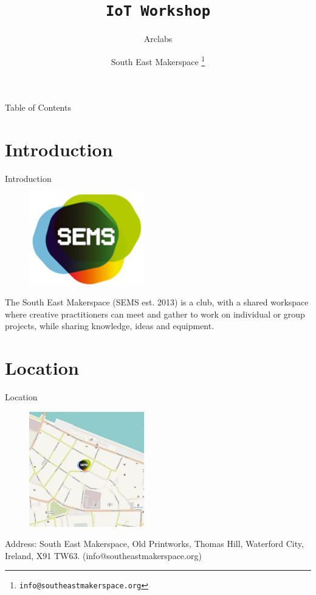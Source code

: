 \documentclass{beamer}
\title{\texttt{IoT Workshop}}
\subtitle{Arclabs}
\author{South East Makerspace \footnote{\texttt{info@southeastmakerspace.org}}}
\begin{document}
\begin{frame}
  \maketitle
\end{frame}


\begin{frame}{Table of Contents}
  \tableofcontents
\end{frame}

\section{Introduction}
\begin{frame}{Introduction}
%
\begin{figure}
	\centering
	\includegraphics[width=5cm]{images/test}
	\label{fig:logo}
\end{figure}
%

The South East Makerspace (SEMS est. 2013) is a club, with a shared workspace where creative practitioners can meet and gather to work on individual or group projects, while sharing knowledge, ideas and equipment.
\end{frame}


\section{Location}
\begin{frame}{Location}
	\begin{figure}
		\centering
		\includegraphics[width=5cm]{images/sems_1}
		\label{fig:logo1}
	\end{figure}
	
	Address: South East Makerspace, Old Printworks, Thomas Hill, Waterford City, Ireland, X91 TW63. (info@southeastmakerspace.org)
\end{frame}
\end{document}
